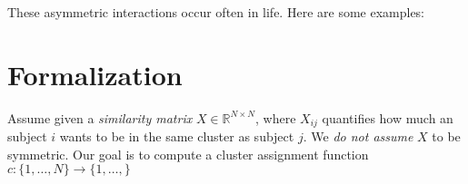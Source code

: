 These asymmetric interactions occur often in life. Here are some examples:


\section{Formalization}

Assume given a \emph{similarity matrix} $X \in \mathbb{R}^{N \times N}$, where $X_{ij}$ quantifies how much an subject $i$ wants to be in the same cluster as subject $j$. We \emph{do not assume} $X$ to be symmetric. Our goal is to compute a cluster assignment function $c : \{1, \ldots, N\} \to \{1, \ldots, \}$ 